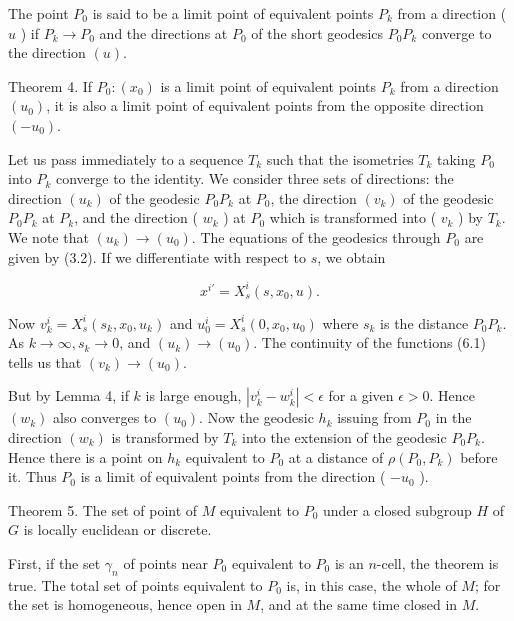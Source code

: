 \documentclass[10pt]{article}
\begin{document}
The point $P_{0}$ is said to be a limit point of equivalent points $P_{k}$ from a direction ( $u$ ) if $P_{k} \rightarrow P_{0}$ and the directions at $P_{0}$ of the short geodesics $P_{0} P_{k}$ converge to the direction $(u)$.

Theorem 4. If $P_{0}:\left(x_{0}\right)$ is a limit point of equivalent points $P_{k}$ from a direction $\left(u_{0}\right)$, it is also a limit point of equivalent points from the opposite direction $\left(-u_{0}\right)$.

Let us pass immediately to a sequence $T_{k}$ such that the isometries $T_{k}$ taking $P_{0}$ into $P_{k}$ converge to the identity. We consider three sets of directions: the direction $\left(u_{k}\right)$ of the geodesic $P_{0} P_{k}$ at $P_{0}$, the direction $\left(v_{k}\right)$ of the geodesic $P_{0} P_{k}$ at $P_{k}$, and the direction ( $w_{k}$ ) at $P_{0}$ which is transformed into ( $v_{k}$ ) by $T_{k}$. We note that $\left(u_{k}\right) \rightarrow\left(u_{0}\right)$. The equations of the geodesics through $P_{0}$ are given by (3.2). If we differentiate with respect to $s$, we obtain


\begin{equation*}
x^{i \prime}=X_{s}^{i}\left(s, x_{0}, u\right) . \tag{6.1}
\end{equation*}


Now $v_{k}^{i}=X_{s}^{i}\left(s_{k}, x_{0}, u_{k}\right)$ and $u_{0}^{i}=X_{s}^{i}\left(0, x_{0}, u_{0}\right)$ where $s_{k}$ is the distance $P_{0} P_{k}$. As $k \rightarrow \infty, s_{k} \rightarrow 0$, and $\left(u_{k}\right) \rightarrow\left(u_{0}\right)$. The continuity of the functions (6.1) tells us that $\left(v_{k}\right) \rightarrow\left(u_{0}\right)$.

But by Lemma 4, if $k$ is large enough, $\left|v_{k}^{i}-w_{k}^{i}\right|<\epsilon$ for a given $\epsilon>0$. Hence $\left(w_{k}\right)$ also converges to $\left(u_{0}\right)$. Now the geodesic $h_{k}$ issuing from $P_{0}$ in the direction $\left(w_{k}\right)$ is transformed by $T_{k}$ into the extension of the geodesic $P_{0} P_{k}$. Hence there is a point on $h_{k}$ equivalent to $P_{0}$ at a distance of $\rho\left(P_{0}, P_{k}\right)$ before it. Thus $P_{0}$ is a limit of equivalent points from the direction ( $-u_{0}$ ).

Theorem 5. The set of point of $M$ equivalent to $P_{0}$ under a closed subgroup $H$ of $G$ is locally euclidean or discrete.

First, if the set $\gamma_{n}$ of points near $P_{0}$ equivalent to $P_{0}$ is an $n$-cell, the theorem is true. The total set of points equivalent to $P_{0}$ is, in this case, the whole of $M$; for the set is homogeneous, hence open in $M$, and at the same time closed in $M$.
\end{document}
